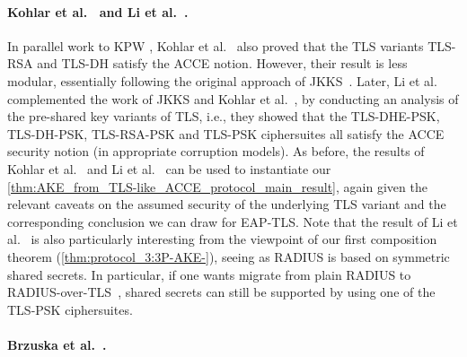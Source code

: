 




\paragraph{Kohlar et al.~\texorpdfstring{\cite{EPRINT:KohSchSch13}}{} and Li et al.~\texorpdfstring{\cite{PKC:LSYKS14}}{}.}
In parallel work to KPW \cite{C:KraPatWee13},
Kohlar et al.~\cite{EPRINT:KohSchSch13} also proved that the TLS variants TLS-RSA and TLS-DH satisfy the ACCE notion.
However,
their result is less modular,
essentially following the original approach of JKKS~\cite{C:JKSS12}.
Later,
Li et al.~\cite{PKC:LSYKS14} complemented the work of JKKS and Kohlar et al.~\cite{EPRINT:KohSchSch13},
by conducting an analysis of the pre-shared key variants of TLS,
i.e., they showed that the TLS-DHE-PSK, TLS-DH-PSK, TLS-RSA-PSK and TLS-PSK ciphersuites all satisfy the ACCE security notion (in appropriate corruption models).
As before,
the results of Kohlar et al.~\cite{EPRINT:KohSchSch13} and Li et al.~\cite{PKC:LSYKS14}
can be used to instantiate our \cref{thm:AKE_from_TLS-like_ACCE_protocol_main_result},
again given the relevant caveats on the assumed security of the underlying TLS variant and the corresponding conclusion we can draw for EAP-TLS.
Note that the result of Li et al.~\cite{PKC:LSYKS14} is also particularly interesting from the viewpoint of our first composition theorem (\cref{thm:protocol_3:3P-AKE-}),
seeing as RADIUS is based on symmetric shared secrets.
In particular,
if one wants migrate from plain RADIUS to RADIUS-over-TLS~\cite{IETF:RFC6614:RADIUS_over_TLS},
shared secrets can still be supported by using one of the TLS-PSK ciphersuites.



\paragraph{Brzuska et al.~\texorpdfstring{\cite{BrzuskaFSWW:2012:less_is_more}}{}.}

